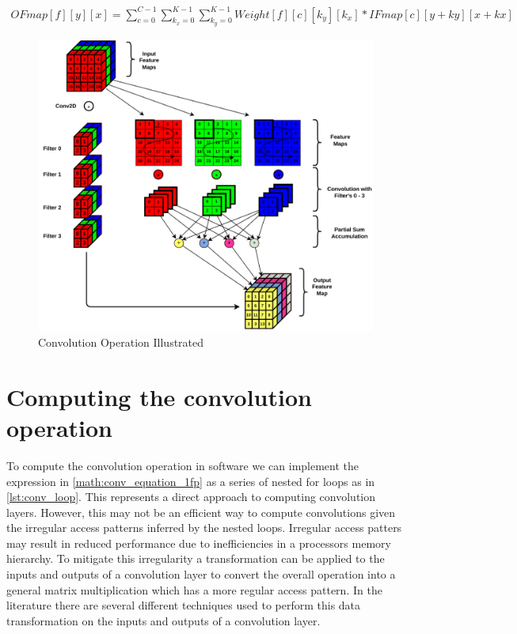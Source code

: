 \begin{align}
    OFmap[f][y][x] = \displaystyle\sum\limits_{c=0}^{C-1}\displaystyle\sum\limits_{k_x=0}^{K-1}\displaystyle\sum\limits_{k_y=0}^{K-1}Weight[f][c][k_y][k_x]*IFmap[c][y+ky][x+kx]
    \label{math:conv_equation_1fp}
\end{align}

\begin{figure}[ht]
    \centering
    \includegraphics[scale=0.6]{fig/ConvExplained.pdf}
    \caption{Convolution Operation Illustrated}
    \label{fig:conv_explained}
\end{figure}

\section{Computing the convolution operation}
\label{chap:background:computing_conv}

To compute the convolution operation in software we can implement the expression
in \autoref{math:conv_equation_1fp} as a series of nested for loops as in
\autoref{lst:conv_loop}. This represents a direct approach to computing
convolution layers. However, this may not be an efficient way to compute
convolutions given the irregular access patterns inferred by the nested loops.
Irregular access patters may result in reduced performance due to inefficiencies
in a processors memory hierarchy. To mitigate this irregularity a transformation
can be applied to the inputs and outputs of a convolution layer to convert the
overall operation into a general matrix multiplication which has a more regular
access pattern. In the literature
\cite{cafe_con_troll} there
are several different techniques used to perform this data transformation on the
inputs and outputs of a convolution layer.

